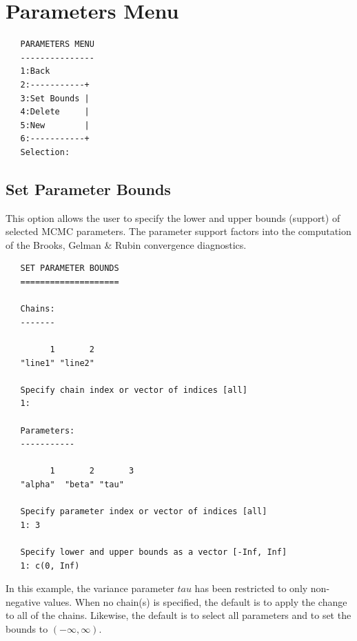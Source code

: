 \documentclass[12pt,letterpaper]{report}
\begin{document}
\section{Parameters Menu}
\noindent

\vskip 9pt
\begin{tiny}
\begin{verbatim}
   PARAMETERS MENU
   ---------------
   1:Back
   2:-----------+
   3:Set Bounds |
   4:Delete     |
   5:New        |
   6:-----------+
   Selection:
\end{verbatim}
\end{tiny}

\subsection{Set Parameter Bounds}
\noindent
This option allows the user to specify the lower and upper bounds (support) of
selected MCMC parameters. The parameter support factors into the computation of
the Brooks, Gelman \& Rubin convergence diagnostics.
\vskip 9pt
\begin{tiny}
\begin{verbatim}
   SET PARAMETER BOUNDS
   ====================

   Chains:
   -------

         1       2
   "line1" "line2"

   Specify chain index or vector of indices [all]
   1:

   Parameters:
   -----------

         1       2       3
   "alpha"  "beta" "tau"

   Specify parameter index or vector of indices [all]
   1: 3

   Specify lower and upper bounds as a vector [-Inf, Inf]
   1: c(0, Inf)
\end{verbatim}
\end{tiny}
In this example, the variance parameter $tau$ has been restricted to only
non-negative values. When no chain(s) is specified, the default is to apply the
change to all of the chains. Likewise, the default is to select all parameters
and to set the bounds to $(-\infty, \infty)$.
\end{document}
